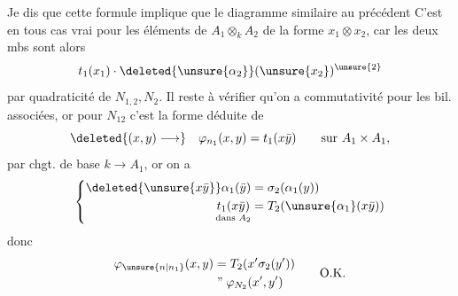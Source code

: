 Je dis que cette formule implique que le diagramme similaire au précédent
C'est en tous cas vrai pour les éléments de  $A_1\otimes_k A_2$ de la forme $x_1\otimes x_2$, car les deux mbs sont alors
\[
 t_1(x_1)\cdot\deleted{\unsure{\alpha_2}}(\unsure{x_2})^{\unsure{2}}
\]
par quadraticité de $N_{1,2},N_2$. Il reste à vérifier qu'on a commutativité pour les  bil. associées, or pour $N_{12}$ c'est la forme déduite de
\[
 \deleted{(x,y)\longrightarrow}\quad\varphi_{n_1}(x,y)=t_1(x\bar y)\qquad\text{sur }A_1\times A_1,
\]
par chgt. de base $k\longrightarrow A_1$, or on a
\[
 \left\{\begin{aligned}
 \deleted{\unsure{x\bar y}}\alpha_1(\bar y)&=\sigma_2(\alpha_1(y))\\
 \underset{\text{dans }A_2}{t_1(x\bar y)}&=T_2(\unsure{\alpha_1}(x\bar y))
 \end{aligned}\right.
\]
donc
\[
 \begin{aligned}
 \varphi_{\unsure{n|n_1}}(x,y)&=T_2(x'\sigma_2(y'))\\
 &\mathrel{\text{''}}\varphi_{N_2}(x',y')
 \end{aligned}\qquad\text{O.K.}
\]
